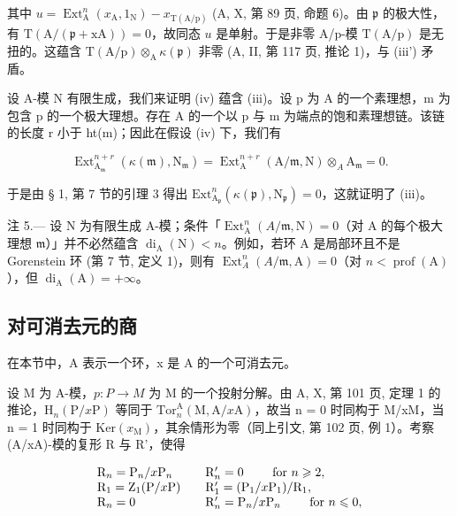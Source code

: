 其中 \(u = \operatorname{Ext}_{\mathrm{A}}^{n}(x_{\mathrm{A}}, 1_{\mathrm{N}}) - x_{\mathrm{T(A/p)}}\) (A, X, 第 89 页, 命题 6)。由 \(\mathfrak{p}\) 的极大性，有 \(\mathrm{T(A / (\mathfrak{p} + xA))} = 0\)，故同态 \(u\) 是单射。于是非零 A/p-模 \(\mathrm{T(A/p)}\) 是无扭的。这蕴含 \(\mathrm{T(A/p)} \otimes_{\mathrm{A}} \kappa(\mathfrak{p})\) 非零 (A, II, 第 117 页, 推论 1)，与 (iii') 矛盾。

设 A-模 N 有限生成，我们来证明 (iv) 蕴含 (iii)。设 p 为 A 的一个素理想，m 为包含 p 的一个极大理想。存在 A 的一个以 p 与 m 为端点的饱和素理想链。该链的长度 r 小于 ht(m)；因此在假设 (iv) 下，我们有

\[
\operatorname{Ext} _ {\mathrm{A} _ {\mathfrak {m}}} ^ {n + r} (\kappa (\mathfrak {m}), \mathrm{N} _ {\mathfrak {m}}) = \operatorname{Ext} _ {\mathrm{A}} ^ {n + r} (\mathrm{A} / \mathfrak {m}, \mathrm{N}) \otimes_ {A} \mathrm{A} _ {\mathfrak {m}} = 0.
\]

于是由 § 1, 第 7 节的引理 3 得出 \(\mathrm{Ext}_{\mathrm{A}_{\mathfrak{p}}}^{n}(\kappa(\mathfrak{p}),\mathrm{N}_{\mathfrak{p}})=0\)，这就证明了 (iii)。

注 5.— 设 N 为有限生成 A-模；条件「\(\operatorname{Ext}_{\mathrm{A}}^{n}(A/\mathfrak{m},\mathrm{N})=0\)（对 A 的每个极大理想 \(\mathfrak{m}\)）」并不必然蕴含 \(\operatorname{di}_{\mathrm{A}}(\mathrm{N})<n\)。例如，若环 A 是局部环且不是 Gorenstein 环 (第 7 节, 定义 1)，则有 \(\operatorname{Ext}_{A}^{n}(A/\mathfrak{m},\mathrm{A})=0\)（对 \(n<\operatorname{prof}(\mathrm{A})\)），但 \(\operatorname{di}_{\mathrm{A}}(\mathrm{A})=+\infty\)。

\subsection{对可消去元的商}

在本节中，A 表示一个环，x 是 A 的一个可消去元。

设 M 为 A-模，\(p: P \to M\) 为 M 的一个投射分解。由 A, X, 第 101 页, 定理 1 的推论，\(\mathrm{H}_{n}(\mathrm{P}/x\mathrm{P})\) 等同于 \(\mathrm{Tor}_{n}^{\mathrm{A}}(\mathrm{M}, \mathrm{A}/x\mathrm{A})\)，故当 n = 0 时同构于 M/xM，当 n = 1 时同构于 \(\mathrm{Ker}(x_{\mathrm{M}})\)，其余情形为零（同上引文, 第 102 页, 例 1）。考察 (A/xA)-模的复形 R 与 R'，使得

\[
\begin{array}{l l} \mathrm{R} _ {n} = \mathrm{P} _ {n} / x \mathrm{P} _ {n} & \quad \mathrm{R} _ {n} ^ {\prime} = 0 \qquad \text { for } n \geqslant 2, \\ \mathrm{R} _ {1} = \mathrm{Z} _ {1} (\mathrm{P} / x \mathrm{P}) & \quad \mathrm{R} _ {1} ^ {\prime} = (\mathrm{P} _ {1} / x \mathrm{P} _ {1}) / \mathrm{R} _ {1}, \\ \mathrm{R} _ {n} = 0 & \quad \mathrm{R} _ {n} ^ {\prime} = \mathrm{P} _ {n} / x \mathrm{P} _ {n} \qquad \text { for } n \leqslant 0, \end{array}
\]

